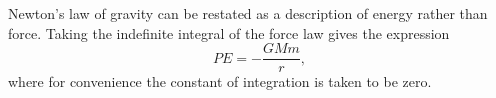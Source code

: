 Newton's law of gravity can be restated as a description of energy rather
than force. Taking the indefinite integral of the force law gives the expression
\begin{equation*}
  PE = -\frac{GMm}{r},
\end{equation*}
where for convenience the constant of integration is taken to be zero.
